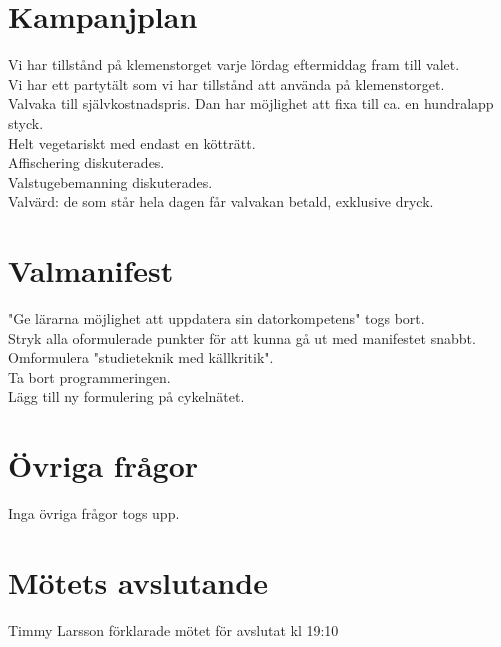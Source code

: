 \documentclass[a4paper,10pt]{article}
\begin{document}
\section{Kampanjplan}
Vi har tillstånd på klemenstorget varje lördag eftermiddag fram till valet.\\
Vi har ett partytält som vi har tillstånd att använda på klemenstorget.\\
Valvaka till självkostnadspris. Dan har möjlighet att fixa till ca. en hundralapp styck.\\
Helt vegetariskt med endast en kötträtt.\\
Affischering diskuterades.\\
Valstugebemanning diskuterades.\\
Valvärd: de som står hela dagen får valvakan betald, exklusive dryck.

\section{Valmanifest}
"Ge lärarna möjlighet att uppdatera sin datorkompetens" togs bort.\\
Stryk alla oformulerade punkter för att kunna gå ut med manifestet snabbt.\\
Omformulera "studieteknik med källkritik".\\
Ta bort programmeringen.\\
Lägg till ny formulering på cykelnätet.\\

\section{Övriga frågor}
Inga övriga frågor togs upp.

\section{Mötets avslutande}
Timmy Larsson förklarade mötet för avslutat kl 19:10
\end{document}
